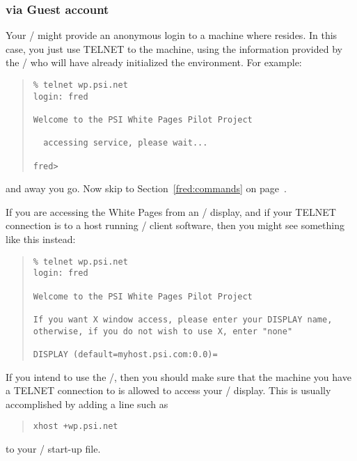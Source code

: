 \subsubsection	{via Guest account}
Your \camayoc/ might provide an anonymous login to a machine where
 resides.
In this case,
you just use TELNET to the machine,
using the information provided by the \camayoc/
who will have already initialized the environment.
For example:
\begin{quote}\small\begin{verbatim}
% telnet wp.psi.net
login: fred

Welcome to the PSI White Pages Pilot Project

  accessing service, please wait...

fred> 
\end{verbatim}\end{quote}
and away you go.
Now skip to Section~\ref{fred:commands} on page~\pageref{fred:commands}.

If you are accessing the White Pages from an \XW/ display,
and if your TELNET connection is to a host running \XW/ client software,
then you might see something like this instead:
\begin{quote}\small\begin{verbatim}
% telnet wp.psi.net
login: fred

Welcome to the PSI White Pages Pilot Project

If you want X window access, please enter your DISPLAY name,
otherwise, if you do not wish to use X, enter "none"

DISPLAY (default=myhost.psi.com:0.0)=
\end{verbatim}\end{quote}
If you intend to use the \xwindows/,
then you should make sure that the machine you have a TELNET connection to is
allowed to access your \XW/ display.
This is usually accomplished by adding a line such as
\begin{quote}\small\begin{verbatim}
xhost +wp.psi.net
\end{verbatim}\end{quote}
to your \XW/ start-up file.


